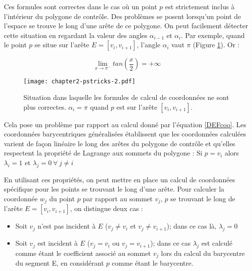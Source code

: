 

Ces formules sont correctes dans le cas où un point $p$ est strictement inclus
à l'intérieur du polygone de contrôle. Des problèmes se posent lorsqu'un point
de l'espace se trouve le long d'une arête de ce polygone. On peut facilement
détecter cette situation en regardant la valeur des angles $\alpha_{i-1}$ et
$\alpha_i$. Par exemple, quand le point $p$ se situe sur l'arête $E =
[v_i,v_{i+1}]$, l'angle $\alpha_i$ vaut $\pi$ (Figure \ref{DEFinc}). Or :

\begin{displaymath}
  \lim\limits_{x \to \pi^-} tan(\frac{x}{2}) = +\infty
\end{displaymath}

\begin{figure}[ht]
  \begin{center}
    \texttt{[image: chapter2-pstricks-2.pdf]}

    \caption[Cas particulier MVC] {Situation dans laquelle les
formules de calcul de coordonnées ne sont plus correctes. $\alpha_i = \pi$
quand $p$ est sur l'arête $[v_i,v_{i+1}]$.}

    \label{DEFinc}
  \end{center}
\end{figure}

Cela pose un problème par rapport au calcul donné par l'équation \ref{DEFcoo}.
Les coordonnées barycentriques généralisées établissent que les coordonnées
calculées varient de façon linéaire le long des arêtes du polygone de contrôle
et qu'elles respectent la propriété de Lagrange aux sommets du polygone : Si
$p = v_i$ alors $\lambda_i = 1$ et $\lambda_j = 0 ~\forall~ j \neq i$

En utilisant ces propriétés, on peut mettre en place un calcul de coordonnées
spécifique pour les points se trouvant le long d'une arête. Pour calculer la
coordonnée $w_j$ du point $p$ par rapport au sommet $v_j$, $p$ se trouvant le
long de l'arête $E = [v_i,v_{i+1}]$, on distingue deux cas :

\begin{itemize}

\item Soit $v_j$ n'est pas incident à $E$ ($v_j \neq v_i$ et $v_j \neq
v_{i+1}$); dans ce cas là, $\lambda_j = 0$

\item Soit $v_j$ est incident à $E$ ($v_j = v_i$ ou $v_j = v_{i+1}$); dans ce
cas $\lambda_j$ est calculé comme étant le coefficient associé au sommet $v_j$
lors du calcul du barycentre du segment E, en considérant $p$ comme étant le
barycentre.

\end{itemize}